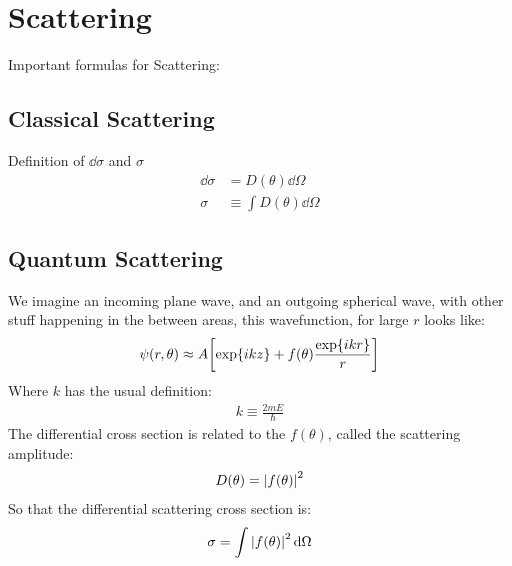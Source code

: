 \section{Scattering}
Important formulas for Scattering:
\subsection{Classical Scattering}
Definition of $\dd{\sigma}$ and $\sigma$
\begin{align*}
  \dd{\sigma}&=D(\theta)\dd{\Omega}\\
  \sigma&\equiv\int D(\theta)\dd{\Omega}
\end{align*}
\subsection{Quantum Scattering}
We imagine an incoming plane wave, and an outgoing spherical wave, with other stuff happening in the between areas, this wavefunction, for large $r$ looks like:
\begin{align*}
  \psi(r,\theta)\approx A\qty[\exp{ikz}+f(\theta)\frac{\exp{ikr}}{r}]
\end{align*}
Where $k$ has the usual definition:
\begin{align*}
  k\equiv\frac{2mE}{\hbar}
\end{align*}
The differential cross section is related to the $f(\theta)$, called the scattering amplitude:
\begin{align*}
  D(\theta)=\abs{f(\theta)}^2
\end{align*}
So that the differential scattering cross section is:
\begin{align*}
  \sigma=\int\abs{f(\theta)}^2\dd{\Omega}
\end{align*}
